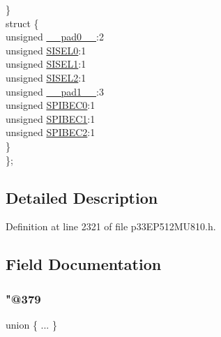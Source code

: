 \begin{DoxyCompactItemize}
\begin{tabbing}
\>\} \\
\>struct \{\\
\>\>unsigned \hyperlink{structtag_s_p_i4_s_t_a_t_b_i_t_s_adf71f3d8410c1f1dbbc96680a92c49af}{\_\_pad0\_\_}:2\\
\>\>unsigned \hyperlink{structtag_s_p_i4_s_t_a_t_b_i_t_s_a718402bd0465fbc4fd6a2a312afc68cc}{SISEL0}:1\\
\>\>unsigned \hyperlink{structtag_s_p_i4_s_t_a_t_b_i_t_s_a70b3f81521b4df5d2bdc98a48ab8a777}{SISEL1}:1\\
\>\>unsigned \hyperlink{structtag_s_p_i4_s_t_a_t_b_i_t_s_a9a7815799509b1ff427025989182aa2a}{SISEL2}:1\\
\>\>unsigned \hyperlink{structtag_s_p_i4_s_t_a_t_b_i_t_s_acaf2d0924a107ec6e8d2e31febaf66f9}{\_\_pad1\_\_}:3\\
\>\>unsigned \hyperlink{structtag_s_p_i4_s_t_a_t_b_i_t_s_aa9b4c159cfcb7a8c3eaf3369b146b3a2}{SPIBEC0}:1\\
\>\>unsigned \hyperlink{structtag_s_p_i4_s_t_a_t_b_i_t_s_ae1c44e4e7fb1aec2d5856ba13ed7851b}{SPIBEC1}:1\\
\>\>unsigned \hyperlink{structtag_s_p_i4_s_t_a_t_b_i_t_s_a995b2cfafb90409d16825fc4d4b23a35}{SPIBEC2}:1\\
\>\} \\
\}; \\

\end{tabbing}\end{DoxyCompactItemize}


\subsection{Detailed Description}


Definition at line 2321 of file p33\+E\+P512\+M\+U810.\+h.



\subsection{Field Documentation}
\mbox{\label{structtag_s_p_i4_s_t_a_t_b_i_t_s_ad1deb10be88f4be5b3d32256338c13a4}} 
\subsubsection{\texorpdfstring{"@379}{@379}}
{\footnotesize\ttfamily union \{ ... \} }

\mbox{\label{structtag_s_p_i4_s_t_a_t_b_i_t_s_adf71f3d8410c1f1dbbc96680a92c49af}} 

